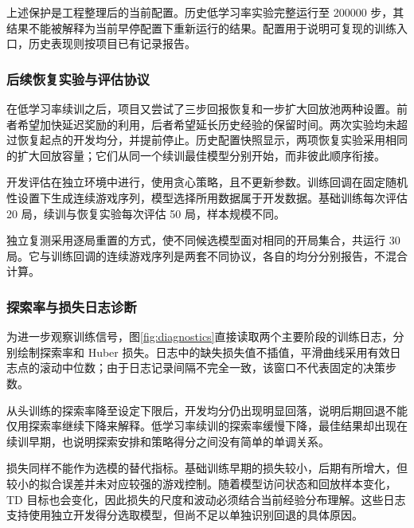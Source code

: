 上述保护是工程整理后的当前配置。历史低学习率实验完整运行至 200000 步，其结果不能被解释为当前早停配置下重新运行的结果。配置用于说明可复现的训练入口，历史表现则按项目已有记录报告。

\subsubsection{后续恢复实验与评估协议}
在低学习率续训之后，项目又尝试了三步回报恢复和一步扩大回放池两种设置。前者希望加快延迟奖励的利用，后者希望延长历史经验的保留时间。两次实验均未超过恢复起点的开发均分，并提前停止。历史配置快照显示，两项恢复实验采用相同的扩大回放容量；它们从同一个续训最佳模型分别开始，而非彼此顺序衔接。

开发评估在独立环境中进行，使用贪心策略，且不更新参数。训练回调在固定随机性设置下生成连续游戏序列，模型选择所用数据属于开发数据。基础训练每次评估 20 局，续训与恢复实验每次评估 50 局，样本规模不同。

独立复测采用逐局重置的方式，使不同候选模型面对相同的开局集合，共运行 30 局。它与训练回调的连续游戏序列是两套不同协议，各自的均分分别报告，不混合计算。


\subsubsection{探索率与损失日志诊断}
为进一步观察训练信号，图\ref{fig:diagnostics}直接读取两个主要阶段的训练日志，分别绘制探索率和 Huber 损失。日志中的缺失损失值不插值，平滑曲线采用有效日志点的滚动中位数；由于日志记录间隔不完全一致，该窗口不代表固定的决策步数。

从头训练的探索率降至设定下限后，开发均分仍出现明显回落，说明后期回退不能仅用探索率继续下降来解释。低学习率续训的探索率缓慢下降，最佳结果却出现在续训早期，也说明探索安排和策略得分之间没有简单的单调关系。

损失同样不能作为选模的替代指标。基础训练早期的损失较小，后期有所增大，但较小的拟合误差并未对应较强的游戏控制。随着模型访问状态和回放样本变化，TD 目标也会变化，因此损失的尺度和波动必须结合当前经验分布理解。这些日志支持使用独立开发得分选取模型，但尚不足以单独识别回退的具体原因。


